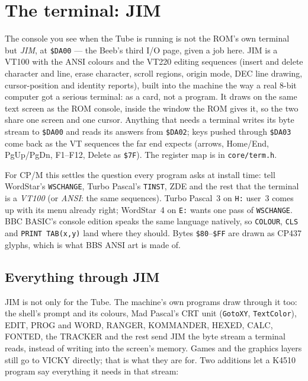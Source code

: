 \section{The terminal: JIM}
The console you see when the Tube is running is not the ROM's own terminal
but \emph{JIM}, at \texttt{\$DA00} --- the Beeb's third I/O page, given a
job here. JIM is a VT100 with the ANSI colours and the VT220 editing
sequences (insert and delete character and line, erase character, scroll
regions, origin mode, DEC line drawing, cursor-position and identity
reports), built into the machine the way a real 8-bit computer got a
serious terminal: as a card, not a program. It draws on the same text
screen as the ROM console, inside the window the ROM gives it, so the two
share one screen and one cursor. Anything that needs a terminal writes its
byte stream to \texttt{\$DA00} and reads its answers from \texttt{\$DA02};
keys pushed through \texttt{\$DA03} come back as the VT sequences the far
end expects (arrows, Home/End, PgUp/PgDn, F1--F12, Delete as \texttt{\$7F}).
The register map is in \texttt{core/term.h}.


For CP/M this settles the question every program asks at install time:
tell WordStar's \texttt{WSCHANGE}, Turbo Pascal's \texttt{TINST}, ZDE and
the rest that the terminal is a \emph{VT100} (or \emph{ANSI}: the same
sequences). Turbo Pascal~3 on \texttt{H:} user~3 comes up with its menu
already right; WordStar~4 on \texttt{E:} wants one pass of
\texttt{WSCHANGE}. BBC BASIC's console edition speaks the same language
natively, so \verb|COLOUR|, \verb|CLS| and \verb|PRINT TAB(x,y)| land
where they should. Bytes \texttt{\$80}--\texttt{\$FF} are drawn as CP437
glyphs, which is what BBS ANSI art is made of.

\subsection*{Everything through JIM}
JIM is not only for the Tube. The machine's own programs
draw through it too: the shell's prompt and its colours, Mad Pascal's CRT
unit (\verb|GotoXY|, \verb|TextColor|), EDIT, PROG and WORD, RANGER,
KOMMANDER, HEXED, CALC, FONTED, the TRACKER and the rest send JIM the
byte stream a terminal reads, instead of writing into the screen's memory.
Games and the graphics layers still go to VICKY directly; that is what
they are for. Two additions let a K4510 program say everything it needs
in that stream:

